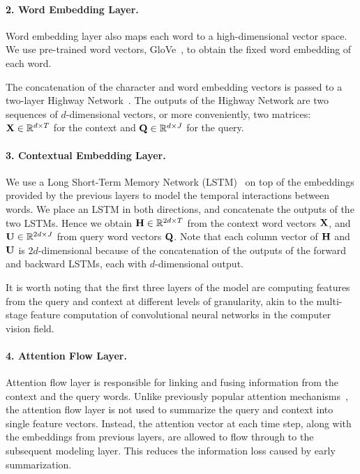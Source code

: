 \documentclass{article} \usepackage{iclr2017_conference,times}
\begin{document}
\paragraph{2. Word Embedding Layer.}\label{subsec:emb}
Word embedding layer also maps each word to a high-dimensional vector space. We use pre-trained word vectors, GloVe~\citep{glove}, to obtain the fixed word embedding of each word.

The concatenation of the character and word embedding vectors is passed to a two-layer Highway Network~\citep{highway}. 
The outputs of the Highway Network are two sequences of $d$-dimensional vectors, or more conveniently, two matrices: ${\bf X} \in \mathbb{R}^{d \times T}$ for the context and ${\bf Q} \in \mathbb{R}^{d \times J}$ for the query.

\paragraph{3. Contextual Embedding Layer.}\label{subsec:pre}
We use a Long Short-Term Memory Network (LSTM)~\citep{lstm} on top of the embeddings provided by the previous layers to model the temporal interactions between words. We place an LSTM in both directions, and concatenate the outputs of the two LSTMs. Hence we obtain ${\bf H} \in \mathbb{R}^{2d \times T}$ from the context word vectors ${\bf X}$, and ${\bf U} \in \mathbb{R}^{2d \times J}$ from query word vectors ${\bf Q}$.
Note that each column vector of ${\bf H}$ and ${\bf U}$ is $2d$-dimensional because of the concatenation of the outputs of the forward and backward LSTMs, each with $d$-dimensional output.

It is worth noting that the first three layers of the model are computing features from the query and context at different levels of granularity, akin to the multi-stage feature computation of convolutional neural networks in the computer vision field.

\paragraph{4. Attention Flow Layer.}\label{subsec:att}
Attention flow layer is responsible for linking and fusing information from the context and the query words. 
Unlike previously popular attention mechanisms~\citep{memnn,hill2015goldilocks,iterative,reasonet}, the attention flow layer is not used to summarize the query and context into single feature vectors. 
Instead, the attention vector at each time step, along with the embeddings from previous layers, are allowed to flow through to the subsequent modeling layer. 
This reduces the information loss caused by early summarization.
 
\end{document}
